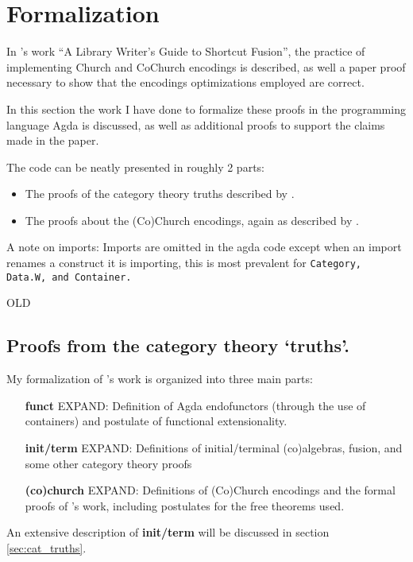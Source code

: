 \section{Formalization}\label{sec:formalization}
In \cite{Harper2011}'s work ``A Library Writer's Guide to Shortcut Fusion'', the practice of implementing Church and CoChurch encodings is described, as well a paper proof necessary to show that the encodings optimizations employed are correct.

In this section the work I have done to formalize these proofs in the programming language Agda is discussed, as well as additional proofs to support the claims made in the paper.

The code can be neatly presented in roughly 2 parts:
\begin{itemize}
  \item The proofs of the category theory truths described by \cite{Harper2011}.
  \item The proofs about the (Co)Church encodings, again as described by \cite{Harper2011}.
\end{itemize}

A note on imports: Imports are omitted in the agda code except when an import renames a construct it is importing, this is most prevalent for \tt{Category}, \tt{Data.W}, and \tt{Container}.




\iffalse
OLD
\subsection{Proofs from the category theory `truths'.}
My formalization of \cite{Harper2011}'s work is organized into three main parts:
\begin{itemize}
    \item[\textbf{funct}] EXPAND: Definition of Agda endofunctors (through the use of containers) and postulate of functional extensionality.
    \item[\textbf{init/term}] EXPAND: Definitions of initial/terminal (co)algebras, fusion, and some other category theory proofs
    \item[\textbf{(co)church}] EXPAND: Definitions of (Co)Church encodings and the formal proofs of \cite{Harper2011}'s work, including postulates for the free theorems used.
\end{itemize}
An extensive description of \textbf{init/term} will be discussed in section \ref{sec:cat_truths}.

